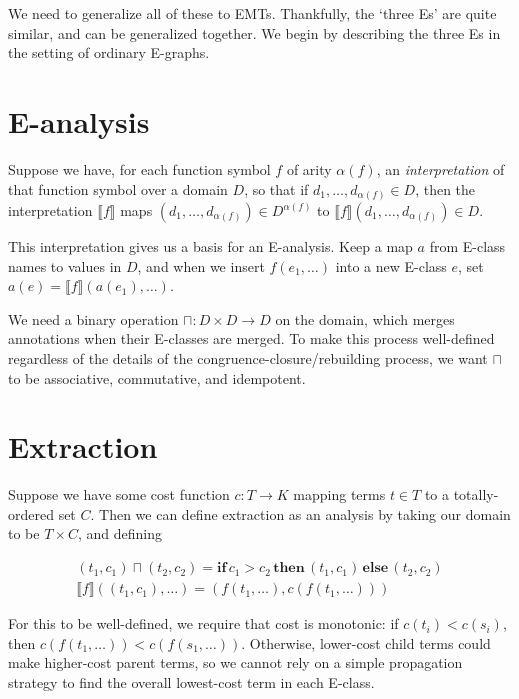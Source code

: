 \documentclass[12pt,a4paper,twoside,openright]{report}
\numberwithin{equation}{chapter}		%
\numberwithin{figure}{chapter}			%
\numberwithin{table}{chapter}			%
\theoremstyle{definition}
\theoremstyle{plain}
\begin{document}
We need to generalize all of these to EMTs. Thankfully, the `three Es' are quite similar, and can be generalized together. We begin by describing the three Es in the setting of ordinary E-graphs.

\section{E-analysis}

Suppose we have, for each function symbol $f$ of arity $\alpha(f)$, an \emph{interpretation} of that function symbol over a domain $D$, so that if $d_1, \ldots, d_{\alpha(f)} \in D$, then the interpretation $\llbracket f \rrbracket$ maps $(d_1, \ldots, d_{\alpha(f)}) \in D^{\alpha(f)}$ to $\llbracket f \rrbracket (d_1, \ldots, d_{\alpha(f)}) \in D$.

This interpretation gives us a basis for an E-analysis. Keep a map $a$ from E-class names to values in $D$, and when we insert $f(e_1, \ldots)$ into a new E-class $e$, set $a(e) = \llbracket f \rrbracket (a(e_1), \ldots)$.

We need a binary operation $\sqcap : D \times D \rightarrow D$ on the domain, which merges annotations when their E-classes are merged. To make this process well-defined regardless of the details of the congruence-closure/rebuilding process, we want $\sqcap$ to be associative, commutative, and idempotent.

\section{Extraction} \label{extraction}
Suppose we have some cost function $c : T \rightarrow K$ mapping terms $t \in T$ to a totally-ordered set $C$. Then we can define extraction as an analysis by taking our domain to be $T \times C$, and defining

\begin{align*}
(t_1, c_1) \sqcap (t_2, c_2) = \textbf{if}\, c_1 > c_2 \,\textbf{then}\, (t_1, c_1) \,\textbf{else}\, (t_2,  c_2) \\
\llbracket f \rrbracket ((t_1, c_1), \ldots) = (f(t_1, \ldots), c(f(t_1, \ldots)))
\end{align*}

For this to be well-defined, we require that cost is monotonic: if $c(t_i) < c(s_i)$, then $c(f(t_1, \ldots)) < c(f(s_1, \ldots))$. Otherwise, lower-cost child terms could make higher-cost parent terms, so we cannot rely on a simple propagation strategy to find the overall lowest-cost term in each E-class.
\end{document}
